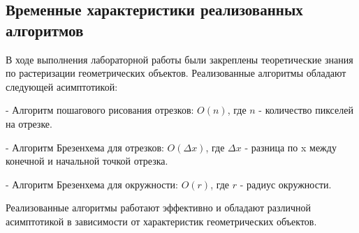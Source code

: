 \documentclass{article}
\begin{document}
    \subsection{Временные характеристики реализованных алгоритмов}
    В ходе выполнения лабораторной работы были закреплены теоретические знания по растеризации геометрических объектов. Реализованные алгоритмы обладают следующей асимптотикой:

    - Алгоритм пошагового рисования отрезков: \(O(n)\), где \(n\) - количество пикселей на отрезке.

    - Алгоритм Брезенхема для отрезков: \(O(\Delta x)\), где \(\Delta x\) - разница по x между конечной и начальной точкой отрезка.

    - Алгоритм Брезенхема для окружности: \(O(r)\), где \(r\) - радиус окружности.

    Реализованные алгоритмы работают эффективно и обладают различной асимптотикой в зависимости от характеристик геометрических объектов.
\end{document}

